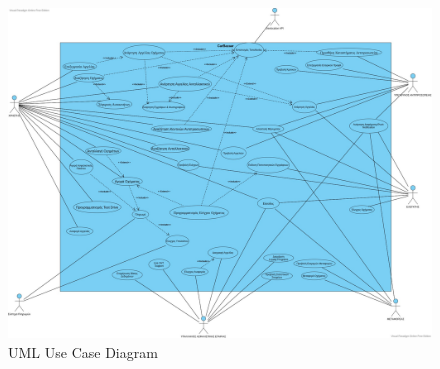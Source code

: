 \documentclass{../ol-softwaremanual}
\begin{document}
	\begin{figure}[htbp!]
		\includegraphics[scale=0.23]{img/UML_Use_case_diagramm.png}
		\caption{\en UML Use Case Diagram \gr}
	\end{figure}
	
	
	
	
\end{document}
